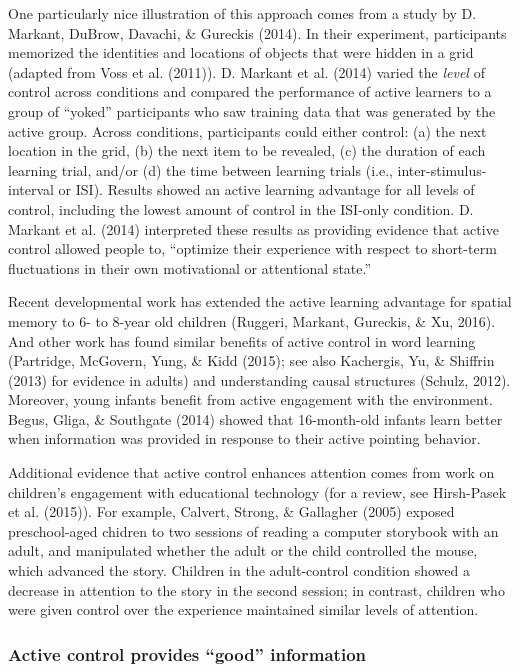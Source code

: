 \documentclass[a4paper,man,apacite,floatsintext]{apa6}
\begin{document}
One particularly nice illustration of this approach comes from a study
by D. Markant, DuBrow, Davachi, \& Gureckis (2014). In their experiment,
participants memorized the identities and locations of objects that were
hidden in a grid (adapted from Voss et al. (2011)). D. Markant et al.
(2014) varied the \emph{level} of control across conditions and compared
the performance of active learners to a group of ``yoked'' participants
who saw training data that was generated by the active group. Across
conditions, participants could either control: (a) the next location in
the grid, (b) the next item to be revealed, (c) the duration of each
learning trial, and/or (d) the time between learning trials (i.e.,
inter-stimulus-interval or ISI). Results showed an active learning
advantage for all levels of control, including the lowest amount of
control in the ISI-only condition. D. Markant et al. (2014) interpreted
these results as providing evidence that active control allowed people
to, ``optimize their experience with respect to short-term fluctuations
in their own motivational or attentional state.''

Recent developmental work has extended the active learning advantage for
spatial memory to 6- to 8-year old children (Ruggeri, Markant, Gureckis,
\& Xu, 2016). And other work has found similar benefits of active
control in word learning (Partridge, McGovern, Yung, \& Kidd (2015); see
also Kachergis, Yu, \& Shiffrin (2013) for evidence in adults) and
understanding causal structures (Schulz, 2012). Moreover, young infants
benefit from active engagement with the environment. Begus, Gliga, \&
Southgate (2014) showed that 16-month-old infants learn better when
information was provided in response to their active pointing behavior.

Additional evidence that active control enhances attention comes from
work on children's engagement with educational technology (for a review,
see Hirsh-Pasek et al. (2015)). For example, Calvert, Strong, \&
Gallagher (2005) exposed preschool-aged chidren to two sessions of
reading a computer storybook with an adult, and manipulated whether the
adult or the child controlled the mouse, which advanced the story.
Children in the adult-control condition showed a decrease in attention
to the story in the second session; in contrast, children who were given
control over the experience maintained similar levels of attention.

\subsubsection{\texorpdfstring{Active control provides ``good''
information}{Active control provides good information}}\label{active-control-provides-good-information}
\end{document}
